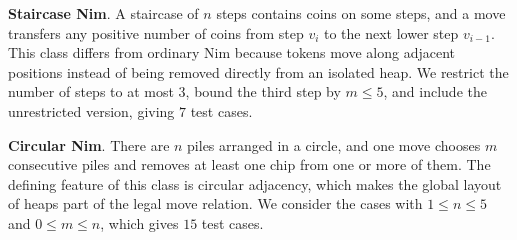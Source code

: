 \documentclass[review]{elsarticle}
\newcommand{\set}[1]{\{ #1 \}}
\newcommand{\tuple}[1]{\langle {#1} \rangle}
\newcommand{\true}{\top}
\newcommand{\statevar}{\mathcal{X}}
\newcommand{\act}{\mathcal{A}}
\newcommand{\constraint}{\mathcal{C}}
\newcommand{\estate}{\mathcal{E}}
\newcommand{\pre}{\mathtt{pre}}
\newcommand{\eff}{\mathtt{eff}}
\begin{document}
\textbf{Staircase Nim}. A staircase of $n$ steps contains coins on some steps, and a move transfers any positive number of coins from step $v_i$ to the next lower step $v_{i-1}$.
This class differs from ordinary Nim because tokens move along adjacent positions instead of being removed directly from an isolated heap.
We restrict the number of steps to at most $3$, bound the third step by $m \le 5$, and include the unrestricted version, giving $7$ test cases.

\textbf{Circular Nim}. There are $n$ piles arranged in a circle, and one move chooses $m$ consecutive piles and removes at least one chip from one or more of them.
The defining feature of this class is circular adjacency, which makes the global layout of heaps part of the legal move relation.
We consider the cases with $1 \le n \le 5$ and $0 \le m \le n$, which gives $15$ test cases.
\end{document}
